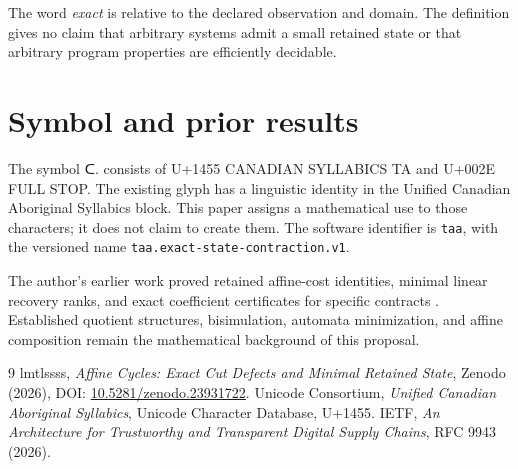 \documentclass[11pt,a4paper]{article}
\begin{document}
The word \emph{exact} is relative to the declared observation and domain.
The definition gives no claim that arbitrary systems admit a small
retained state or that arbitrary program properties are efficiently
decidable.

\section{Symbol and prior results}
The symbol {\taafont ᑕ.} consists of U+1455 CANADIAN SYLLABICS TA and
U+002E FULL STOP. The existing glyph has a linguistic identity in the
Unified Canadian Aboriginal Syllabics block. This paper assigns a
mathematical use to those characters; it does not claim to create them.
The software identifier is \texttt{taa}, with the versioned name
\texttt{taa.exact-state-contraction.v1}.

The author's earlier work proved retained affine-cost identities,
minimal linear recovery ranks, and exact coefficient certificates for
specific contracts \cite{affine}. Established quotient structures,
bisimulation, automata minimization, and affine composition remain
the mathematical background of this proposal.

\begin{thebibliography}{9}
 lmtlssss, \emph{Affine Cycles: Exact Cut Defects and Minimal
Retained State}, Zenodo (2026), DOI: \href{https://doi.org/10.5281/zenodo.23931722}{10.5281/zenodo.23931722}.
 Unicode Consortium, \emph{Unified Canadian Aboriginal Syllabics}, Unicode Character Database, U+1455.
 IETF, \emph{An Architecture for Trustworthy and Transparent Digital Supply Chains}, RFC 9943 (2026).
\end{thebibliography}
\end{document}
